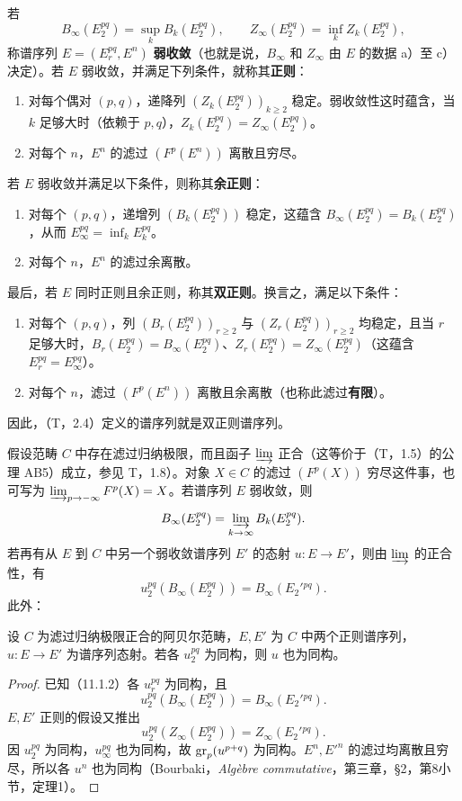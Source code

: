若
\[
B_\infty(E_2^{pq})=\sup_k B_k(E_2^{pq}),\qquad
Z_\infty(E_2^{pq})=\inf_k Z_k(E_2^{pq}),
\]
称谱序列 $E=(E_r^{pq},E^n)$ \textbf{弱收敛}（也就是说，$B_\infty$ 和 $Z_\infty$ 由 $E$ 的数据 a）至 c）决定）。若 $E$ 弱收敛，并满足下列条件，就称其\textbf{正则}：
\begin{enumerate}[label=\arabic*°]
\item 对每个偶对 $(p,q)$，递降列 $(Z_k(E_2^{pq}))_{k\geq2}$ 稳定。弱收敛性这时蕴含，当 $k$ 足够大时（依赖于 $p,q$），$Z_k(E_2^{pq})=Z_\infty(E_2^{pq})$。
\item 对每个 $n$，$E^n$ 的滤过 $(F^p(E^n))$ 离散且穷尽。
\end{enumerate}
若 $E$ 弱收敛并满足以下条件，则称其\textbf{余正则}：
\begin{enumerate}[label=\arabic*°,start=3]
\item 对每个 $(p,q)$，递增列 $(B_k(E_2^{pq}))$ 稳定，这蕴含 $B_\infty(E_2^{pq})=B_k(E_2^{pq})$，从而 $E_\infty^{pq}=\inf_k E_k^{pq}$。
\item 对每个 $n$，$E^n$ 的滤过余离散。
\end{enumerate}
最后，若 $E$ 同时正则且余正则，称其\textbf{双正则}。换言之，满足以下条件：
\begin{enumerate}[label=\alph*)]
\item 对每个 $(p,q)$，列 $(B_r(E_2^{pq}))_{r\geq2}$ 与 $(Z_r(E_2^{pq}))_{r\geq2}$ 均稳定，且当 $r$ 足够大时，$B_r(E_2^{pq})=B_\infty(E_2^{pq})$、$Z_r(E_2^{pq})=Z_\infty(E_2^{pq})$（这蕴含 $E_r^{pq}=E_\infty^{pq}$）。
\item 对每个 $n$，滤过 $(F^p(E^n))$ 离散且余离散（也称此滤过\textbf{有限}）。
\end{enumerate}
因此，（T，2.4）定义的谱序列就是双正则谱序列。

假设范畴 $C$ 中存在滤过归纳极限，而且函子 $\varinjlim$ 正合（这等价于（T，1.5）的公理 AB5）成立，参见 T，1.8）。对象 $X\in C$ 的滤过 $(F^p(X))$ 穷尽这件事，也可写为 $\varinjlim_{p\to-\infty}F^p(X)=X$。若谱序列 $E$ 弱收敛，则
\[
B_\infty(E_2^{pq})=\varinjlim_{k\to\infty}B_k(E_2^{pq}).
\]
若再有从 $E$ 到 $C$ 中另一个弱收敛谱序列 $E'$ 的态射 $u:E\to E'$，则由 $\varinjlim$ 的正合性，有
\[
u_2^{pq}(B_\infty(E_2^{pq}))=B_\infty(E_2'{}^{pq}).
\]
此外：

设 $C$ 为滤过归纳极限正合的阿贝尔范畴，$E,E'$ 为 $C$ 中两个正则谱序列，$u:E\to E'$ 为谱序列态射。若各 $u_2^{pq}$ 为同构，则 $u$ 也为同构。
\begin{proof}
已知（11.1.2）各 $u_r^{pq}$ 为同构，且
\[
u_2^{pq}(B_\infty(E_2^{pq}))=B_\infty(E_2'{}^{pq}).
\]
$E,E'$ 正则的假设又推出
\[
u_2^{pq}(Z_\infty(E_2^{pq}))=Z_\infty(E_2'{}^{pq}).
\]
因 $u_2^{pq}$ 为同构，$u_\infty^{pq}$ 也为同构，故 $\operatorname{gr}_p(u^{p+q})$ 为同构。$E^n,E'^n$ 的滤过均离散且穷尽，所以各 $u^n$ 也为同构（Bourbaki，\textit{Algèbre commutative}，第三章，§2，第8小节，定理1）。
\end{proof}


